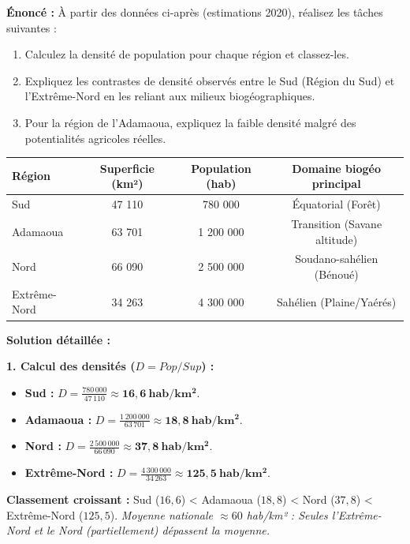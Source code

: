 \documentclass[11pt]{article}
\begin{document}
\begin{exoresolu}
\textbf{Énoncé :} À partir des données ci-après (estimations 2020), réalisez les tâches suivantes :
\begin{enumerate}
    \item Calculez la densité de population pour chaque région et classez-les.
    \item Expliquez les contrastes de densité observés entre le Sud (Région du Sud) et l'Extrême-Nord en les reliant aux milieux biogéographiques.
    \item Pour la région de l'Adamaoua, expliquez la faible densité malgré des potentialités agricoles réelles.
\end{enumerate}
\begin{center}
\begin{tabular}{|l|c|c|c|}\hline
\textbf{Région} & \textbf{Superficie (km²)} & \textbf{Population (hab)} & \textbf{Domaine biogéo principal} \\ \hline
Sud & 47 110 & 780 000 & Équatorial (Forêt) \\ \hline
Adamaoua & 63 701 & 1 200 000 & Transition (Savane altitude) \\ \hline
Nord & 66 090 & 2 500 000 & Soudano-sahélien (Bénoué) \\ \hline
Extrême-Nord & 34 263 & 4 300 000 & Sahélien (Plaine/Yaérés) \\ \hline
\end{tabular}
\end{center}
\tcblower
\textbf{Solution détaillée :}

\textbf{1. Calcul des densités ($D = Pop / Sup$) :}
\begin{itemize}
    \item \textbf{Sud :} $D = \frac{780\,000}{47\,110} \approx \mathbf{16,6\ hab/km^2}$.
    \item \textbf{Adamaoua :} $D = \frac{1\,200\,000}{63\,701} \approx \mathbf{18,8\ hab/km^2}$.
    \item \textbf{Nord :} $D = \frac{2\,500\,000}{66\,090} \approx \mathbf{37,8\ hab/km^2}$.
    \item \textbf{Extrême-Nord :} $D = \frac{4\,300\,000}{34\,263} \approx \mathbf{125,5\ hab/km^2}$.
\end{itemize}
\textbf{Classement croissant :} Sud ($16,6$) < Adamaoua ($18,8$) < Nord ($37,8$) < Extrême-Nord ($125,5$).
\emph{Moyenne nationale $\approx 60$ hab/km² : Seules l'Extrême-Nord et le Nord (partiellement) dépassent la moyenne.}


\end{exoresolu}
\end{document}
